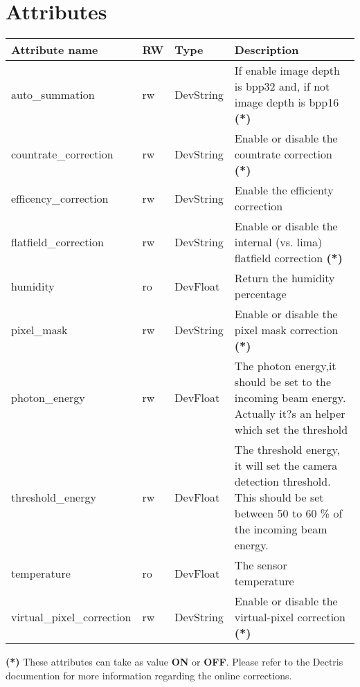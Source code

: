 \documentclass[letterpaper,10pt,english]{sphinxmanual}
\begin{document}
\section{Attributes}
\label{Hamamatsu/hamamatsu:attributes}
\begin{tabulary}{\linewidth}{|L|L|L|L|}
\hline
\textsf{\relax 
Attribute name
} & \textsf{\relax 
RW
} & \textsf{\relax 
Type
} & \textsf{\relax 
Description
}\\
\hline
auto\_summation
 & 
rw
 & 
DevString
 & 
If enable image depth is bpp32 and, if not image depth is bpp16 \textbf{(*)}
\\
\hline
countrate\_correction
 & 
rw
 & 
DevString
 & 
Enable or disable the countrate correction \textbf{(*)}
\\
\hline
efficency\_correction
 & 
rw
 & 
DevString
 & 
Enable the efficienty correction
\\
\hline
flatfield\_correction
 & 
rw
 & 
DevString
 & 
Enable or disable the internal (vs. lima) flatfield correction \textbf{(*)}
\\
\hline
humidity
 & 
ro
 & 
DevFloat
 & 
Return the humidity percentage
\\
\hline
pixel\_mask
 & 
rw
 & 
DevString
 & 
Enable or disable the pixel mask correction \textbf{(*)}
\\
\hline
photon\_energy
 & 
rw
 & 
DevFloat
 & 
The photon energy,it should be set to the incoming beam energy. Actually it?s an helper which set the threshold
\\
\hline
threshold\_energy
 & 
rw
 & 
DevFloat
 & 
The threshold energy, it will set the camera detection threshold. This should be set between 50 to 60 \% of the incoming beam energy.
\\
\hline
temperature
 & 
ro
 & 
DevFloat
 & 
The sensor temperature
\\
\hline
virtual\_pixel\_correction
 & 
rw
 & 
DevString
 & 
Enable or disable the virtual-pixel correction \textbf{(*)}
\\
\hline\end{tabulary}


\textbf{(*)} These attributes can take as value \textbf{ON} or \textbf{OFF}. Please refer to the Dectris documention for more information regarding
the online corrections.
\end{document}

